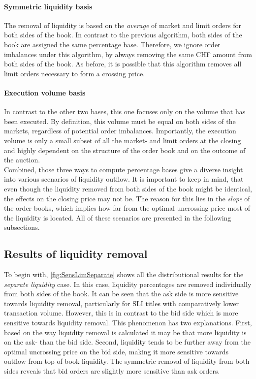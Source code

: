 \documentclass[11pt,a4paper, notitlepage]{article}
\begin{document}
	\paragraph{Symmetric liquidity basis}
	The removal of liquidity is based on the \emph{average} of market and limit orders for both sides of the book. In contrast to the previous algorithm, both sides of the book are assigned the same percentage base. Therefore, we ignore order imbalances under this algorithm, by always removing the same CHF amount from both sides of the book. As before, it is possible that this algorithm removes all limit orders necessary to form a crossing price.
	
	\paragraph{Execution volume basis}
	In contrast to the other two bases, this one focuses only on the volume that has been executed. By definition, this volume must be equal on both sides of the markets, regardless of potential order imbalances. Importantly, the execution volume is only a small subset of all the market- and limit orders at the closing and highly dependent on the structure of the order book and on the outcome of the auction.  \\
	
	Combined, those three ways to compute percentage bases give a diverse insight into various scenarios of liquidity outflow. It is important to keep in mind, that even though the liquidity removed from both sides of the book might be identical, the effects on the closing price may not be. The reason for this lies in the \emph{slope} of the order books, which implies how far from the optimal uncrossing price most of the liquidity is located. All of these scenarios are presented in the following subsections.
	
	\subsection{Results of liquidity removal} \label{subsec:results-of-liquidity-removal}
	
	To begin with, \cref{fig:SensLimSeparate} shows all the distributional results for the \emph{separate liquidity} case. In this case, liquidity percentages are removed individually from both sides of the book. It can be seen that the ask side is more sensitive towards liquidity removal, particularly for \ac{SLI} titles with comparatively lower transaction volume. However, this is in contrast to the bid side which is more sensitive towards liquidity removal. This phenomenon has two explanations. First, based on the way liquidity removal is calculated it may be that more liquidity is on the ask- than the bid side. Second, liquidity tends to be further away from the optimal uncrossing price on the bid side, making it more sensitive towards outflow from top-of-book liquidity. The symmetric removal of liquidity from both sides reveals that bid orders are slightly more sensitive than ask orders.
	
\end{document}
